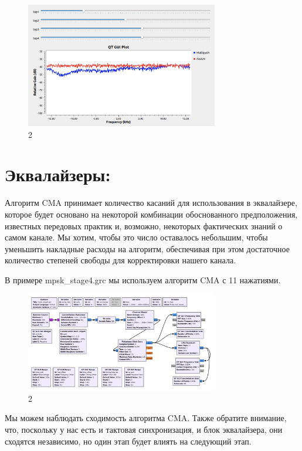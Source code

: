 \documentclass[10pt,a4paper,oneside]{article}
\begin{document}
\begin{figure}[H]
        \centering
        \includegraphics[width=0.75\textwidth]{pics/18.png}
        \caption{2}
        \label{fig:first}
\end{figure}

\section{Эквалайзеры:}

Алгоритм CMA принимает количество касаний для использования в эквалайзере, которое будет основано на некоторой комбинации обоснованного предположения, известных передовых практик и, возможно, некоторых фактических знаний о самом канале. Мы хотим, чтобы это число оставалось небольшим, чтобы уменьшить накладные расходы на алгоритм, обеспечивая при этом достаточное количество степеней свободы для корректировки нашего канала.

В примере mpsk_stage4.grc мы используем алгоритм CMA с 11 нажатиями.

\begin{figure}[H]
        \centering
        \includegraphics[width=0.75\textwidth]{pics/19.png}
        \caption{2}
        \label{fig:first}
\end{figure}

Мы можем наблюдать сходимость алгоритма CMA. Также обратите внимание, что, поскольку у нас есть и тактовая синхронизация, и блок эквалайзера, они сходятся независимо, но один этап будет влиять на следующий этап.
\end{document}
